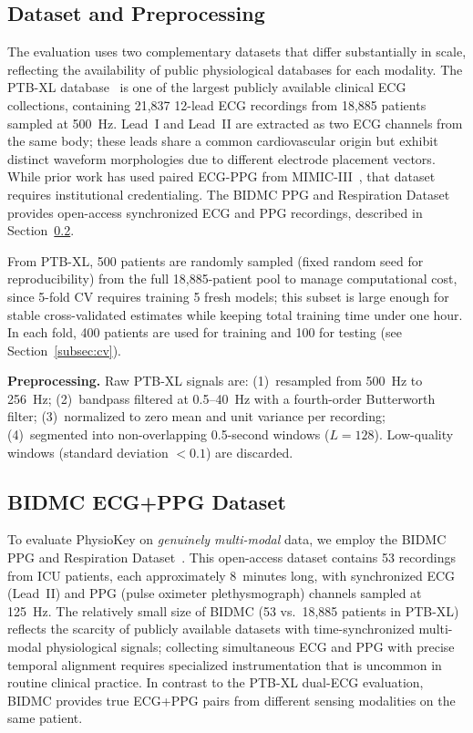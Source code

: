 \documentclass[sensors,article,submit,pdftex,moreauthors]{Definitions/mdpi}
\begin{document}
\subsection{Dataset and Preprocessing}
\label{subsec:datasets}

The evaluation uses two complementary datasets that differ substantially in scale, reflecting the availability of public physiological databases for each modality. The PTB-XL database~\cite{goldberger2000physiobank, wagner2020ptbxl} is one of the largest publicly available clinical ECG collections, containing 21,837 12-lead ECG recordings from 18,885 patients sampled at 500~Hz. Lead~I and Lead~II are extracted as two ECG channels from the same body; these leads share a common cardiovascular origin but exhibit distinct waveform morphologies due to different electrode placement vectors. While prior work has used paired ECG-PPG from MIMIC-III~\cite{johnson2016mimic}, that dataset requires institutional credentialing. The BIDMC PPG and Respiration Dataset~\cite{pimentel2017bidmc} provides open-access synchronized ECG and PPG recordings, described in Section~\ref{subsec:bidmc}.

From PTB-XL, 500 patients are randomly sampled (fixed random seed for reproducibility) from the full 18,885-patient pool to manage computational cost, since 5-fold CV requires training 5 fresh models; this subset is large enough for stable cross-validated estimates while keeping total training time under one hour. In each fold, 400 patients are used for training and 100 for testing (see Section~\ref{subsec:cv}).

\textbf{Preprocessing.} Raw PTB-XL signals are: (1)~resampled from 500~Hz to 256~Hz; (2)~bandpass filtered at 0.5--40~Hz with a fourth-order Butterworth filter; (3)~normalized to zero mean and unit variance per recording; (4)~segmented into non-overlapping 0.5-second windows ($L = 128$). Low-quality windows (standard deviation $< 0.1$) are discarded.

\subsection{BIDMC ECG+PPG Dataset}
\label{subsec:bidmc}

To evaluate PhysioKey on \textit{genuinely multi-modal} data, we employ the BIDMC PPG and Respiration Dataset~\cite{pimentel2017bidmc, goldberger2000physiobank}. This open-access dataset contains 53 recordings from ICU patients, each approximately 8~minutes long, with synchronized ECG (Lead~II) and PPG (pulse oximeter plethysmograph) channels sampled at 125~Hz. The relatively small size of BIDMC (53 vs.\ 18,885 patients in PTB-XL) reflects the scarcity of publicly available datasets with time-synchronized multi-modal physiological signals; collecting simultaneous ECG and PPG with precise temporal alignment requires specialized instrumentation that is uncommon in routine clinical practice. In contrast to the PTB-XL dual-ECG evaluation, BIDMC provides true ECG+PPG pairs from different sensing modalities on the same patient.
\end{document}
